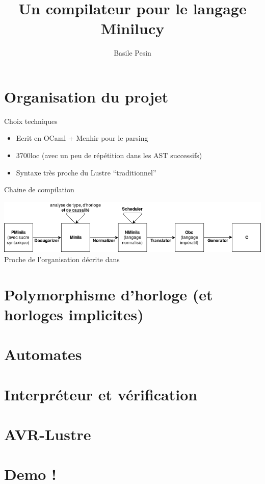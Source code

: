 \documentclass[xcolor={svgnames}]{beamer}
\title{Un compilateur pour le langage Minilucy}
\author{Basile Pesin}
\begin{document}
\maketitle

\section{Organisation du projet}

\begin{frame}{Choix techniques}
  \begin{itemize}
    \item Ecrit en OCaml + Menhir pour le parsing
    \item 3700loc (avec un peu de répétition dans les AST successifs)
    \item Syntaxe très proche du Lustre ``traditionnel''
  \end{itemize}
\end{frame}

\begin{frame}{Chaine de compilation}
  \begin{center}
    \includegraphics[width=.8\paperwidth]{assets/chain.png}
    Proche de l'organisation décrite dans~\citep{Biernacki08}
  \end{center}
\end{frame}

\section{Polymorphisme d'horloge (et horloges implicites)}

\section{Automates}

\section{Interpréteur et vérification}

\section{AVR-Lustre}

\section{Demo !}

\begin{frame}
  \printbibliography
\end{frame}
\end{document}
